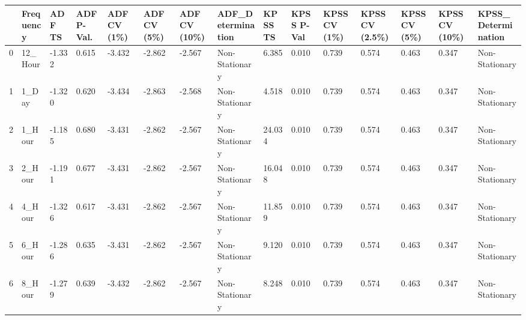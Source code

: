 \begin{tabular}{lllllllllllllll}
\toprule
 & Frequency & ADF TS & ADF P-Val. & ADF CV (1\%) & ADF CV (5\%) & ADF CV (10\%) & ADF_Determination & KPSS TS & KPSS P-Val & KPSS CV (1\%) & KPSS CV (2.5\%) & KPSS CV (5\%) & KPSS CV (10\%) & KPSS_Determination \\
\midrule
0 & 12_Hour & -1.332 & 0.615 & -3.432 & -2.862 & -2.567 & Non-Stationary & 6.385 & 0.010 & 0.739 & 0.574 & 0.463 & 0.347 & Non-Stationary \\
1 & 1_Day & -1.320 & 0.620 & -3.434 & -2.863 & -2.568 & Non-Stationary & 4.518 & 0.010 & 0.739 & 0.574 & 0.463 & 0.347 & Non-Stationary \\
2 & 1_Hour & -1.185 & 0.680 & -3.431 & -2.862 & -2.567 & Non-Stationary & 24.034 & 0.010 & 0.739 & 0.574 & 0.463 & 0.347 & Non-Stationary \\
3 & 2_Hour & -1.191 & 0.677 & -3.431 & -2.862 & -2.567 & Non-Stationary & 16.048 & 0.010 & 0.739 & 0.574 & 0.463 & 0.347 & Non-Stationary \\
4 & 4_Hour & -1.326 & 0.617 & -3.431 & -2.862 & -2.567 & Non-Stationary & 11.859 & 0.010 & 0.739 & 0.574 & 0.463 & 0.347 & Non-Stationary \\
5 & 6_Hour & -1.286 & 0.635 & -3.431 & -2.862 & -2.567 & Non-Stationary & 9.120 & 0.010 & 0.739 & 0.574 & 0.463 & 0.347 & Non-Stationary \\
6 & 8_Hour & -1.279 & 0.639 & -3.432 & -2.862 & -2.567 & Non-Stationary & 8.248 & 0.010 & 0.739 & 0.574 & 0.463 & 0.347 & Non-Stationary \\
\bottomrule
\end{tabular}
